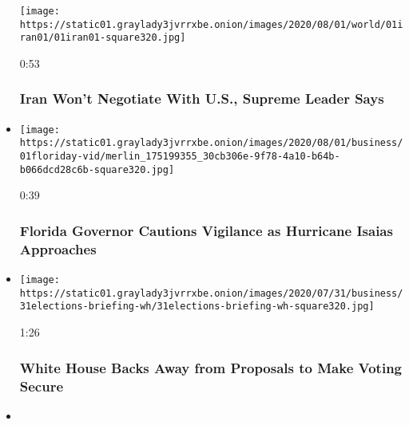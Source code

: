 \begin{itemize}
  \texttt{[image: https://static01.graylady3jvrrxbe.onion/images/2020/08/01/world/01iran01/01iran01-square320.jpg]}

  0:53

  \hypertarget{iran-wont-negotiate-with-us-supreme-leader-says}{%
  \subsubsection{Iran Won't Negotiate With U.S., Supreme Leader
  Says}\label{iran-wont-negotiate-with-us-supreme-leader-says}}
\item
  \href{https://www.nytimes3xbfgragh.onion/video/us/100000007268424/desantis-florida-hurricane-isaias.html?action=click\&module=video-series-bar\&region=header\&pgtype=Article\&playlistId=video/latest-video}{}

  \texttt{[image: https://static01.graylady3jvrrxbe.onion/images/2020/08/01/business/01floriday-vid/merlin\_175199355\_30cb306e-9f78-4a10-b64b-b066dcd28c6b-square320.jpg]}

  0:39

  \hypertarget{florida-governor-cautions-vigilance-as-hurricane-isaias-approaches}{%
  \subsubsection{Florida Governor Cautions Vigilance as Hurricane Isaias
  Approaches}\label{florida-governor-cautions-vigilance-as-hurricane-isaias-approaches}}
\item
  \href{https://www.nytimes3xbfgragh.onion/video/us/100000007267362/white-house-mail-in-ballots-election.html?action=click\&module=video-series-bar\&region=header\&pgtype=Article\&playlistId=video/latest-video}{}

  \texttt{[image: https://static01.graylady3jvrrxbe.onion/images/2020/07/31/business/31elections-briefing-wh/31elections-briefing-wh-square320.jpg]}

  1:26

  \hypertarget{white-house-backs-away-from-proposals-to-make-voting-secure}{%
  \subsubsection{White House Backs Away from Proposals to Make Voting
  Secure}\label{white-house-backs-away-from-proposals-to-make-voting-secure}}
\item
  \href{https://www.nytimes3xbfgragh.onion/video/us/politics/100000007266983/johnson-coronavirus-restrictions.html?action=click\&module=video-series-bar\&region=header\&pgtype=Article\&playlistId=video/latest-video}{}


\end{itemize}
